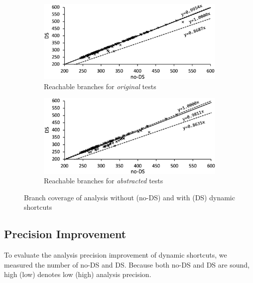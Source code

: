 \begin{figure}[t]
  \centering
  \begin{subfigure}[t]{0.48\textwidth}
    \includegraphics[width=\linewidth]{img/conc-precision}
    \vspace*{-1.5em}
    \caption{Reachable branches for  \textit{original} tests}
    \label{fig:precision-fail}
  \end{subfigure}
  \begin{subfigure}[t]{0.48\textwidth}
    \includegraphics[width=\linewidth]{img/abs-precision}
    \vspace*{-1.5em}
    \caption{Reachable branches for  \textit{abstracted} tests}
    \label{fig:precision-branch}
  \end{subfigure}
  \vspace*{-1em}
  \caption{Branch coverage of analysis without (no-DS) and with (DS) dynamic shortcuts}
  \label{fig:precision}
  \vspace*{-1.5em}
\end{figure}



\subsection{Precision Improvement}

To evaluate the analysis precision improvement of dynamic shortcuts,
we measured the number of  no-DS and DS.
Because both no-DS and DS are sound,
high (low)  denotes low (high) analysis precision.

